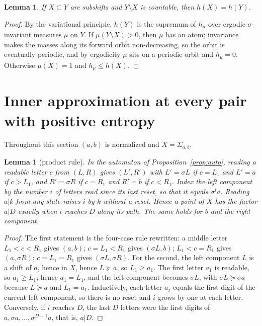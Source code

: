 \documentclass[11pt]{amsart}
\newtheorem{lemma}[theorem]{Lemma}
\theoremstyle{definition}
\theoremstyle{remark}
\newcommand{\gex}{\succcurlyeq}
\begin{document}
\begin{lemma}\label{lem:countable}
If $X\subset Y$ are subshifts and $Y\setminus X$ is countable, then $h(X)=h(Y)$.
\end{lemma}

\begin{proof}
By the variational principle, $h(Y)$ is the supremum of $h_\mu$ over ergodic $\sigma$-invariant measures $\mu$ on $Y$. If $\mu(Y\setminus X)>0$, then $\mu$ has an atom; invariance makes the masses along its forward orbit non-decreasing, so the orbit is eventually periodic, and by ergodicity $\mu$ sits on a periodic orbit and $h_\mu=0$. Otherwise $\mu(X)=1$ and $h_\mu\le h(X)$.
\end{proof}

\section{Inner approximation at every pair with positive entropy}\label{sec:ia}

Throughout this section $(a,b)$ is normalized and $X=\Sigma_{a,b}$.

\begin{lemma}[product rule]\label{lem:P}
In the automaton of Proposition~\ref{prop:auto}, reading a readable letter $c$ from $(L,R)$ gives $(L',R')$ with $L'=\sigma L$ if $c=L_1$ and $L'=a$ if $c>L_1$, and $R'=\sigma R$ if $c=R_1$ and $R'=b$ if $c<R_1$. Index the left component by the number $i$ of letters read since its last reset, so that it equals $\sigma^ia$. Reading $a|k$ from any state raises $i$ by $k$ without a reset. Hence a point of $X$ has the factor $a|D$ exactly when $i$ reaches $D$ along its path. The same holds for $b$ and the right component.
\end{lemma}

\begin{proof}
The first statement is the four-case rule rewritten: a middle letter $L_1<c<R_1$ gives $(a,b)$; $c=L_1<R_1$ gives $(\sigma L,b)$; $L_1<c=R_1$ gives $(a,\sigma R)$; $c=L_1=R_1$ gives $(\sigma L,\sigma R)$. For the second, the left component $L$ is a shift of $a$, hence in $X$, hence $L\gex a$, so $L_1\ge a_1$. The first letter $a_1$ is readable, so $a_1\ge L_1$; hence $a_1=L_1$, and the left component becomes $\sigma L$, with $\sigma L\gex\sigma a$ because $L\gex a$ and $L_1=a_1$. Inductively, each letter $a_j$ equals the first digit of the current left component, so there is no reset and $i$ grows by one at each letter. Conversely, if $i$ reaches $D$, the last $D$ letters were the first digits of $a,\sigma a,\dots,\sigma^{D-1}a$, that is, $a|D$.
\end{proof}
\end{document}
